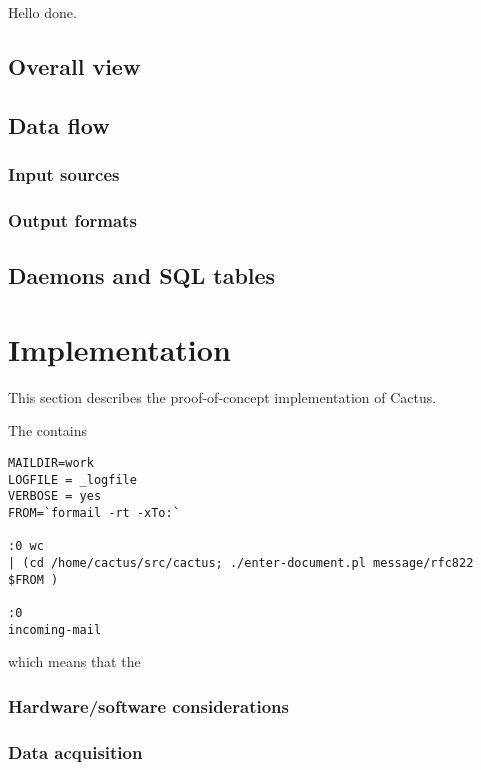 Hello done.
\section{Overall view}
\label{sec:cactus-overall-view}

\section{Data flow}
\label{sec:cactus-data-flow}

\subsection{Input sources}

\subsection{Output formats}

\section{Daemons and SQL tables}
\label{sec:cactus-daemons-and-sql-tables}


\chapter{Implementation}

This section describes the proof-of-concept implementation of Cactus.  


\label{sec:cactus-implementation}
 The
   contains
\begin{verbatim}
MAILDIR=work
LOGFILE = _logfile
VERBOSE = yes
FROM=`formail -rt -xTo:`  

:0 wc 
| (cd /home/cactus/src/cactus; ./enter-document.pl message/rfc822 $FROM )

:0 
incoming-mail
\end{verbatim}
  which means that the 
\subsection{Hardware/software considerations}


\subsection{Data acquisition}




